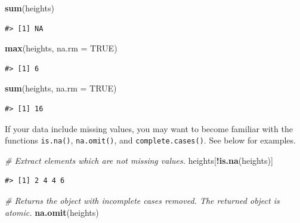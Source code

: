 \documentclass[]{book}
\newenvironment{Shaded}{\begin{snugshade}}{\end{snugshade}}
\newcommand{\KeywordTok}[1]{\textcolor[rgb]{0.13,0.29,0.53}{\textbf{#1}}}
\newcommand{\DataTypeTok}[1]{\textcolor[rgb]{0.13,0.29,0.53}{#1}}
\newcommand{\CommentTok}[1]{\textcolor[rgb]{0.56,0.35,0.01}{\textit{#1}}}
\newcommand{\OtherTok}[1]{\textcolor[rgb]{0.56,0.35,0.01}{#1}}
\newcommand{\OperatorTok}[1]{\textcolor[rgb]{0.81,0.36,0.00}{\textbf{#1}}}
\newcommand{\NormalTok}[1]{#1}
\theoremstyle{definition}
\theoremstyle{definition}
\theoremstyle{remark}
\begin{document}
\begin{Shaded}
\begin{Highlighting}[]
\KeywordTok{sum}\NormalTok{(heights)}
\end{Highlighting}
\end{Shaded}

\begin{verbatim}
#> [1] NA
\end{verbatim}

\begin{Shaded}
\begin{Highlighting}[]
\KeywordTok{max}\NormalTok{(heights, }\DataTypeTok{na.rm =} \OtherTok{TRUE}\NormalTok{)}
\end{Highlighting}
\end{Shaded}

\begin{verbatim}
#> [1] 6
\end{verbatim}

\begin{Shaded}
\begin{Highlighting}[]
\KeywordTok{sum}\NormalTok{(heights, }\DataTypeTok{na.rm =} \OtherTok{TRUE}\NormalTok{)}
\end{Highlighting}
\end{Shaded}

\begin{verbatim}
#> [1] 16
\end{verbatim}

If your data include missing values, you may want to become familiar
with the functions \texttt{is.na()}, \texttt{na.omit()}, and
\texttt{complete.cases()}. See below for examples.

\begin{Shaded}
\begin{Highlighting}[]
\CommentTok{# Extract elements which are not missing values.}
\NormalTok{heights[}\OperatorTok{!}\KeywordTok{is.na}\NormalTok{(heights)]}
\end{Highlighting}
\end{Shaded}

\begin{verbatim}
#> [1] 2 4 4 6
\end{verbatim}

\begin{Shaded}
\begin{Highlighting}[]
\CommentTok{# Returns the object with incomplete cases removed. The returned object is atomic.}
\KeywordTok{na.omit}\NormalTok{(heights)}
\end{Highlighting}
\end{Shaded}
\end{document}
